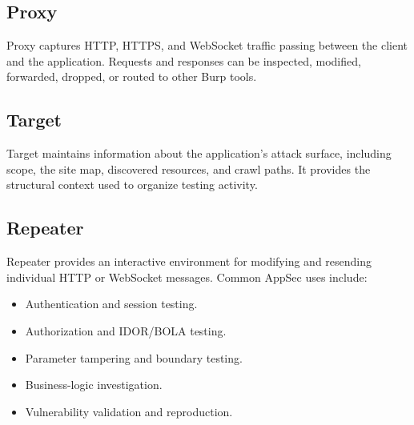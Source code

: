 \documentclass[11pt]{article}
\begin{document}
\begin{center}
\end{center}

\subsection{Proxy}

Proxy captures HTTP, HTTPS, and WebSocket traffic passing between the client and the application. Requests and responses can be inspected, modified, forwarded, dropped, or routed to other Burp tools.

\subsection{Target}

Target maintains information about the application's attack surface, including scope, the site map, discovered resources, and crawl paths. It provides the structural context used to organize testing activity.

\subsection{Repeater}

Repeater provides an interactive environment for modifying and resending individual HTTP or WebSocket messages. Common AppSec uses include:

\begin{itemize}
  \item Authentication and session testing.
  \item Authorization and IDOR/BOLA testing.
  \item Parameter tampering and boundary testing.
  \item Business-logic investigation.
  \item Vulnerability validation and reproduction.
\end{itemize}
\end{document}
